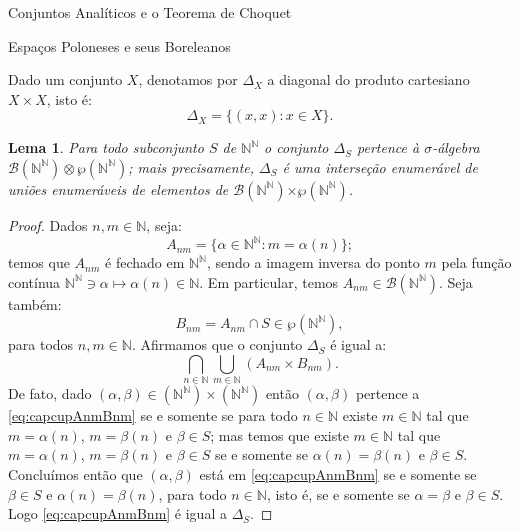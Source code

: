 \documentclass[oneside,final,11pt]{amsbook}
\newcommand{\N}{\mathds N}
\newcommand{\Times}{\pmb{\times}}
\newcommand{\Borel}{\mathcal B}
\theoremstyle{remark}\newtheorem{exercise}{Exercício}[chapter]
\theoremstyle{remark}\newtheorem{*exercise}[exercise]{\hbox to 0pt{\hskip 0pt minus 1fil*}Exercício}
\theoremstyle{definition}\newtheorem{exdefin}{Definição}[chapter]
\theoremstyle{plain}\newtheorem{teo}{Teorema}[section]
\theoremstyle{plain}\newtheorem{lem}[teo]{Lema}
\theoremstyle{plain}\newtheorem{prop}[teo]{Proposição}
\theoremstyle{plain}\newtheorem{cor}[teo]{Corolário}
\theoremstyle{definition}\newtheorem{defin}[teo]{Definição}
\theoremstyle{remark}\newtheorem{rem}[teo]{Observação}
\theoremstyle{definition}\newtheorem{notation}[teo]{Notação}
\theoremstyle{definition}\newtheorem{convention}[teo]{Convenção}
\theoremstyle{definition}\newtheorem{example}[teo]{Exemplo}
\numberwithin{section}{chapter}
\numberwithin{equation}{section}
\begin{document}
\begin{chapter}{Conjuntos Analíticos e o Teorema de Choquet}

\begin{section}{Espaços Poloneses e seus Boreleanos}

Dado um conjunto $X$, denotamos por $\Delta_X$ a diagonal do produto cartesiano
$X\times X$, isto é:
\[\Delta_X=\big\{(x,x):x\in X\big\}.\]

\begin{lem}
Para todo subconjunto $S$ de $\N^\N$ o conjunto $\Delta_S$ pertence à $\sigma$-álgebra
$\Borel(\N^\N)\otimes\wp(\N^\N)$; mais precisamente, $\Delta_S$ é uma interseção enumerável de uniões enumeráveis
de elementos de $\Borel(\N^\N)\Times\wp(\N^\N)$.
\end{lem}
\begin{proof}
Dados $n,m\in\N$, seja:
\[A_{nm}=\big\{\alpha\in\N^\N:m=\alpha(n)\big\};\]
temos que $A_{nm}$ é fechado em $\N^\N$, sendo a imagem inversa do ponto $m$ pela função contínua
$\N^\N\ni\alpha\mapsto\alpha(n)\in\N$. Em particular, temos $A_{nm}\in\Borel(\N^\N)$. Seja também:
\[B_{nm}=A_{nm}\cap S\in\wp(\N^\N),\]
para todos $n,m\in\N$. Afirmamos que o conjunto $\Delta_S$ é igual a:
\begin{equation}\label{eq:capcupAnmBnm}
\bigcap_{n\in\N}\bigcup_{m\in\N}(A_{nm}\times B_{nm}).
\end{equation}
De fato, dado $(\alpha,\beta)\in(\N^\N)\times(\N^\N)$ então $(\alpha,\beta)$ pertence a \eqref{eq:capcupAnmBnm}
se e somente se para todo $n\in\N$ existe $m\in\N$ tal que $m=\alpha(n)$, $m=\beta(n)$ e $\beta\in S$;
mas temos que existe $m\in\N$ tal que $m=\alpha(n)$, $m=\beta(n)$ e $\beta\in S$ se e somente se $\alpha(n)=\beta(n)$
e $\beta\in S$. Concluímos então que $(\alpha,\beta)$ está em \eqref{eq:capcupAnmBnm}
se e somente se $\beta\in S$ e $\alpha(n)=\beta(n)$, para todo $n\in\N$, isto é, se e somente se $\alpha=\beta$
e $\beta\in S$. Logo \eqref{eq:capcupAnmBnm} é igual a $\Delta_S$.
\end{proof}

\end{section}

\end{chapter}

\begingroup
\appendix
\end{document}

